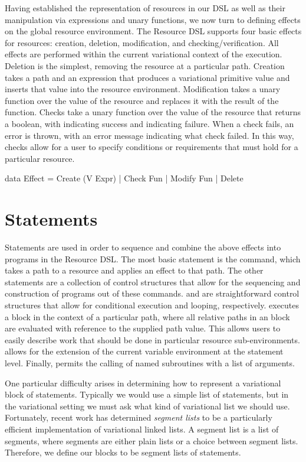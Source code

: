 \documentclass[12pt,oneside]{book}
\begin{document}
Having established the representation of resources in our DSL as well as their manipulation via expressions and unary functions,
we now turn to defining effects on the global resource environment.
The Resource DSL supports four basic effects for resources: creation, deletion, modification, and checking/verification. All effects are performed
within the current variational context of the execution. Deletion is the
simplest, removing the resource at a particular path. Creation takes a path and an expression that produces a variational primitive value
and inserts that value into the resource environment. Modification takes a unary function over the value of the resource and replaces it
with the result of the function. Checks take a unary function over the value of the resource that returns a boolean, with  indicating
success and  indicating failure. When a check fails, an error is thrown, with an error message indicating what check failed.
In this way, checks allow for a user to specify conditions or requirements that must hold for a particular resource.

\begin{program}
data Effect
     = Create (V Expr)
     | Check  Fun
     | Modify Fun
     | Delete
\end{program}

\section{Statements}

Statements are used in order to sequence and combine the above effects into programs in the Resource DSL.
The most basic statement is the  command, which takes a path to a resource and applies an effect to that
path. The other statements are a collection of control structures that allow for the sequencing and construction of
programs out of these  commands.  and  are straightforward control structures that allow
for conditional execution and looping, respectively.  executes a block in the context of a particular path, where all
relative paths in an  block are evaluated with reference to the supplied path value. This allows
users to easily describe work that should be done in particular resource sub-environments.  allows for the
extension of the current variable environment at the statement level. Finally,  permits the calling of named
subroutines with a list of arguments. 

One particular difficulty arises in determining how to represent a variational block of statements. Typically we
would use a simple list of statements, but in the variational setting we must ask what kind of variational list
we should use. Fortunately, recent work \cite{lists} has determined \emph{segment lists} to be a particularly
efficient implementation of variational linked lists. A segment list is a list of segments, where segments are either
plain lists or a choice between segment lists. Therefore, we define our blocks to be segment lists of
statements.
\end{document}

